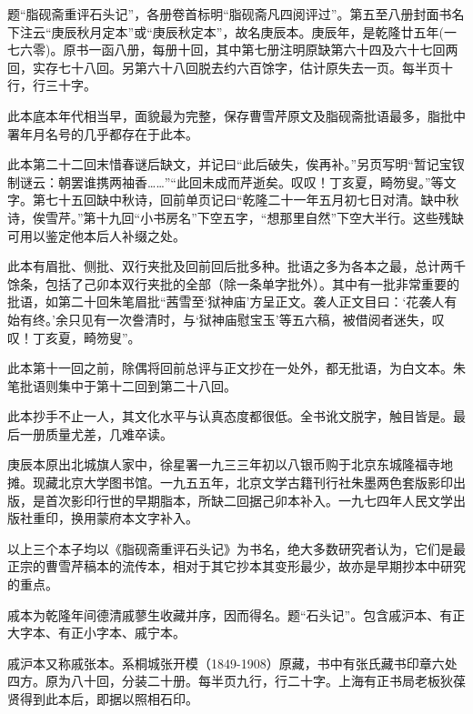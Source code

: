 {}

题“脂砚斋重评石头记”，各册卷首标明“脂砚斋凡四阅评过”。第五至八册封面书名下注云“庚辰秋月定本”或“庚辰秋定本”，故名庚辰本。庚辰年，是乾隆廿五年(一七六零)。原书一函八册，每册十回，其中第七册注明原缺第六十四及六十七回两回，实存七十八回。另第六十八回脱去约六百馀字，估计原失去一页。每半页十行，行三十字。

此本底本年代相当早，面貌最为完整，保存曹雪芹原文及脂砚斋批语最多，脂批中署年月名号的几乎都存在于此本。

此本第二十二回末惜春谜后缺文，并记曰“此后破失，俟再补。”另页写明“暂记宝钗制谜云：朝罢谁携两袖香\ldots{}\ldots{}”“此回未成而芹逝矣。叹叹！丁亥夏，畸笏叟。”等文字。第七十五回缺中秋诗，回前单页记曰“乾隆二十一年五月初七日对清。缺中秋诗，俟雪芹。”第十九回“小书房名”下空五字，“想那里自然”下空大半行。这些残缺可用以鉴定他本后人补缀之处。

此本有眉批、侧批、双行夹批及回前回后批多种。批语之多为各本之最，总计两千馀条，包括了己卯本双行夹批的全部（除一条单字批外）。其中有一批非常重要的批语，如第二十回朱笔眉批“茜雪至‘狱神庙’方呈正文。袭人正文目曰：‘花袭人有始有终。’余只见有一次誊清时，与‘狱神庙慰宝玉’等五六稿，被借阅者迷失，叹叹！丁亥夏，畸笏叟”。

此本第十一回之前，除偶将回前总评与正文抄在一处外，都无批语，为白文本。朱笔批语则集中于第十二回到第二十八回。

此本抄手不止一人，其文化水平与认真态度都很低。全书讹文脱字，触目皆是。最后一册质量尤差，几难卒读。

庚辰本原出北城旗人家中，徐星署一九三三年初以八银币购于北京东城隆福寺地摊。现藏北京大学图书馆。一九五五年，北京文学古籍刊行社朱墨两色套版影印出版，是首次影印行世的早期脂本，所缺二回据己卯本补入。一九七四年人民文学出版社重印，换用蒙府本文字补入。

以上三个本子均以《脂砚斋重评石头记》为书名，绝大多数研究者认为，它们是最正宗的曹雪芹稿本的流传本，相对于其它抄本其变形最少，故亦是早期抄本中研究的重点。

{}

戚本为乾隆年间德清戚蓼生收藏并序，因而得名。题“石头记”。包含戚沪本、有正大字本、有正小字本、戚宁本。

戚沪本又称戚张本。系桐城张开模（1849-1908）原藏，书中有张氏藏书印章六处四方。原为八十回，分装二十册。每半页九行，行二十字。上海有正书局老板狄葆贤得到此本后，即据以照相石印。

